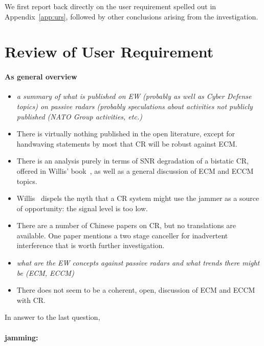 \documentclass[english, 12pt]{report}
\begin{document}
We first report back directly on the user requirement spelled out in Appendix~\ref{app:urs}, followed by other conclusions arising from the investigation.

\section{Review of User Requirement}
\paragraph{As general overview}

\begin{itemize}

\item \emph{a summary of what is published on EW (probably as well as Cyber Defense topics) on passive radars (probably speculations about activities not publicly published (NATO Group activities, etc.)}
\item There is virtually nothing published in the open literature, except for handwaving statements by most that CR will be robust against ECM.
\item There is an analysis purely in terms of SNR degradation of a bistatic CR, offered in Willis' book~\cite{willis:07}, as well as a general discussion of ECM and ECCM topics.
\item Willis~\cite{willis:07} dispels the myth that a CR system might use the jammer as a source of opportunity: the signal level is too low.
\item There are a number of Chinese papers on CR, but no translations are available. One paper mentions a two stage canceller for inadvertent interference that is worth further investigation.


\item \emph{what are the EW concepts against passive radars and what trends there might be (ECM, ECCM)} 
\item There does not seem to be a coherent, open, discussion of ECM and ECCM with CR.
\end{itemize}

In answer to the last question,

\paragraph{jamming:}
\end{document}
